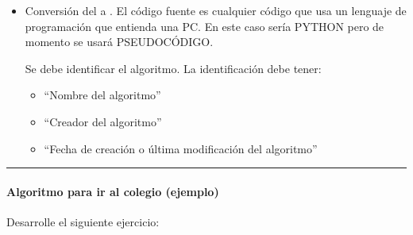 \documentclass[letterpaper,10pt,spanish]{sphinxmanual}
\begin{document}
\begin{itemize}
\begin{itemize}
\item {} 
\sphinxAtStartPar
{} Acciones

\item {} 
\sphinxAtStartPar
{} Condicionales

\item {} 
\sphinxAtStartPar
{} Bucles

\item {} 
\sphinxAtStartPar
{} Orden de secuencia.

\end{itemize}

\sphinxAtStartPar
Después de tener el diagrama de flujo, realizar un análisis.



\bigskip\hrule\bigskip

\item {} 
\sphinxAtStartPar
{}

\sphinxAtStartPar
Conversión del  a .
El código fuente es cualquier código que usa un lenguaje de programación que entienda una PC.
En este caso sería PYTHON pero de momento se usará PSEUDOCÓDIGO.

\sphinxAtStartPar
Se debe identificar el algoritmo. La identificación debe tener:
\begin{itemize}
\item {} 
\sphinxAtStartPar
{} “Nombre del algoritmo”

\item {} 
\sphinxAtStartPar
{} “Creador del algoritmo”

\item {} 
\sphinxAtStartPar
{} “Fecha de creación o última modificación del algoritmo”

\end{itemize}

\end{itemize}


\bigskip\hrule\bigskip



\paragraph{Algoritmo para ir al colegio (ejemplo)}
\label{\detokenize{cursos/ofimatica11/recursos/T03:algoritmo-para-ir-al-colegio-ejemplo}}
\sphinxAtStartPar
Desarrolle el siguiente ejercicio:
\end{document}
